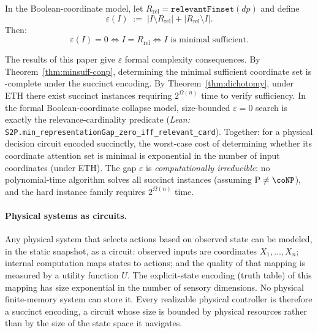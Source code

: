 \begin{proposition}
\label{prop:representation-gap}
In the Boolean-coordinate model, let $R_{\mathrm{rel}}=\texttt{relevantFinset}(dp)$ and define
\[
\varepsilon(I)\;:=\;|I\setminus R_{\mathrm{rel}}| + |R_{\mathrm{rel}}\setminus I|.
\]
Then:
\[
\varepsilon(I)=0 \iff I=R_{\mathrm{rel}}
\iff I \text{ is minimal sufficient}.
\]
\end{proposition}

The results of this paper give $\varepsilon$ formal complexity consequences. By Theorem~\ref{thm:minsuff-conp}, determining the minimal sufficient coordinate set is \coNP-complete under the succinct encoding. By Theorem~\ref{thm:dichotomy}, under ETH there exist succinct instances requiring $2^{\Omega(n)}$ time to verify sufficiency. In the formal Boolean-coordinate collapse model, size-bounded $\varepsilon=0$ search is exactly the relevance-cardinality predicate (\textit{Lean:} \nolinkurl{S2P.min_representationGap_zero_iff_relevant_card}). Together: for a physical decision circuit encoded succinctly, the worst-case cost of determining whether its coordinate attention set is minimal is exponential in the number of input coordinates (under ETH). The gap $\varepsilon$ is \emph{computationally irreducible}: no polynomial-time algorithm solves all succinct instances (assuming $\mathrm{P} \neq \coNP$), and the hard instance family requires $2^{\Omega(n)}$ time.

\paragraph{Physical systems as circuits.}
Any physical system that selects actions based on observed state can be modeled, in the static snapshot, as a circuit: observed inputs are coordinates $X_1, \ldots, X_n$; internal computation maps states to actions; and the quality of that mapping is measured by a utility function $U$.
The explicit-state encoding (truth table) of this mapping has size exponential in the number of sensory dimensions.
No physical finite-memory system can store it.
Every realizable physical controller is therefore a succinct encoding, a circuit whose size is bounded by physical resources rather than by the size of the state space it navigates.

